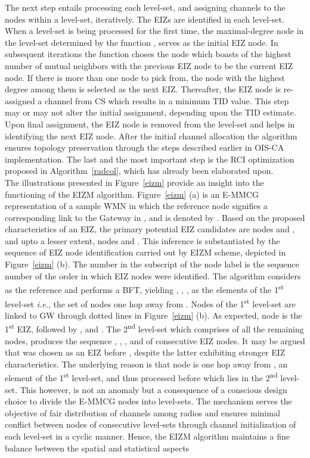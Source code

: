 \documentclass[conference]{IEEEtran}
\begin{document}
The next step entails processing each level-set, and assigning channels to the nodes within a level-set, iteratively. The EIZs are identified in each level-set. When a level-set is being processed for the first time, the maximal-degree node in the level-set determined by the function , serves as the initial EIZ node. In subsequent iterations the function  choses the node which boasts of the highest number of mutual neighbors with the previous EIZ node to be the current EIZ node. If there is more than one node to pick from, the node with the highest degree among them is selected as the next EIZ. Thereafter, the EIZ node is re-assigned a channel from CS which results in a minimum TID value. This step may or may not alter the initial assignment, depending upon the TID estimate. Upon final assignment, the EIZ node is removed from the level-set and helps in identifying the next EIZ node. After the initial channel allocation the algorithm ensures topology preservation through 
the steps described earlier in OIS-CA implementation. The last and the most important step is the RCI optimization proposed in Algorithm~\ref{radcol}, which has already been elaborated upon.\\
The illustrations presented in Figure~\ref{eizm} provide an insight into the functioning of the EIZM algorithm. Figure~\ref{eizm} (a) is an E-MMCG representation of a sample WMN in which the reference node signifies a corresponding link to the Gateway in , and is denoted by . Based on the proposed characteristics of an EIZ, the primary potential EIZ candidates are nodes  and , and upto a lesser extent, nodes  and . This inference is substantiated by the sequence of EIZ node identification carried out by EIZM scheme, depicted in Figure~\ref{eizm} (b). The number in the subscript of the node label is the sequence number of the order in which EIZ nodes were identified. The algorithm considers  as the reference and performs a BFT, yielding {, , , } as the elements of the 1\textsuperscript{st} level-set \emph{i.e.}, the set of nodes one hop away from . Nodes of the 1\textsuperscript{st} level-set are linked to GW through dotted lines in Figure~\ref{eizm} (b). As expected, 
node  is the 
1\textsuperscript{st} EIZ, followed by ,  and . The 2\textsuperscript{nd} level-set which comprises of all the remaining nodes, produces the sequence , , ,  and  of consecutive EIZ nodes. It may be argued that  was chosen as an EIZ before , despite the latter exhibiting stronger EIZ characteristics. The underlying reason is that node  is one hop away from , an element of the 1\textsuperscript{st} level-set, and thus processed before  which lies in the 2\textsuperscript{nd} level-set. This however, is not an anomaly but a consequence of a conscious design choice to divide the E-MMCG nodes into level-sets. The mechanism serves the objective of fair distribution of channels among radios and ensures minimal conflict between nodes of consecutive level-sets through channel initialization of each level-set in a cyclic manner. Hence, the EIZM algorithm maintains a fine balance between the spatial and statistical aspects 
\end{document}
